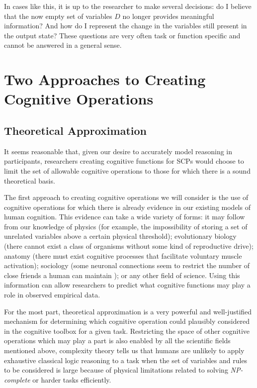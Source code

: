 {In cases like this, it is up to the researcher to make several decisions: do I believe that the now empty set of variables $D$ no longer provides meaningful information? And how do I represent the change in the variables still present in the output state? These questions are very often task or function specific and cannot be answered in a general sense.

\section{Two Approaches to Creating Cognitive Operations}
\subsection{Theoretical Approximation}
It seems reasonable that, given our desire to accurately model reasoning in participants, researchers creating cognitive functions for SCPs would choose to limit the set of allowable cognitive operations to those for which there is a sound theoretical basis.

The first approach to creating cognitive operations we will consider is the use of cognitive operations for which there is already evidence in our existing models of human cognition. This evidence can take a wide variety of forms: it may follow from our knowledge of physics (for example, the impossibility of storing a set of unrelated variables above a certain physical threshold); evolutionary biology (there cannot exist a class of organisms without some kind of reproductive drive); anatomy (there must exist cognitive processes that facilitate voluntary muscle activation); sociology (some neuronal connections seem to restrict the number of close friends a human can maintain \citep{gonccalves2011modeling}); or any other field of science. Using this information can allow researchers to predict what cognitive functions may play a role in observed empirical data. 

For the most part, theoretical approximation is a very powerful and well-justified mechanism for determining which cognitive operation could plausibly considered in the cognitive toolbox for a given task. Restricting the space of other cognitive operations which may play a part is also enabled by all the scientific fields mentioned above, complexity theory tells us that humans are unlikely to apply exhaustive classical logic reasoning to a task when the set of variables and rules to be considered is large because of physical limitations related to solving \textit{NP-complete} or harder tasks efficiently.

}
